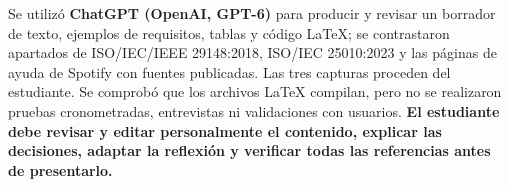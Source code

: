 Se utilizó \textbf{ChatGPT (OpenAI, GPT-6)} para producir y revisar un borrador de texto, ejemplos de requisitos, tablas y código LaTeX; se contrastaron apartados de ISO/IEC/IEEE 29148:2018, ISO/IEC 25010:2023 y las páginas de ayuda de Spotify con fuentes publicadas. Las tres capturas proceden del estudiante. Se comprobó que los archivos LaTeX compilan, pero no se realizaron pruebas cronometradas, entrevistas ni validaciones con usuarios. \textbf{El estudiante debe revisar y editar personalmente el contenido, explicar las decisiones, adaptar la reflexión y verificar todas las referencias antes de presentarlo.}
